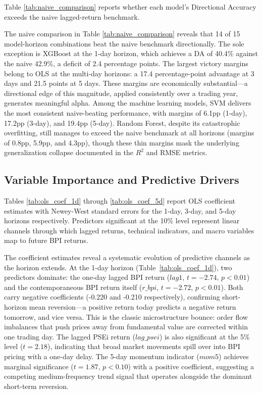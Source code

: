 \documentclass[12pt]{article}
\begin{document}
Table \ref{tab:naive_comparison} reports whether each model's Directional Accuracy exceeds the naive lagged-return benchmark.



The naive comparison in Table \ref{tab:naive_comparison} reveals that 14 of 15 model-horizon combinations beat the naive benchmark directionally. The sole exception is XGBoost at the 1-day horizon, which achieves a DA of 40.4\% against the naive 42.9\%, a deficit of 2.4 percentage points. The largest victory margins belong to OLS at the multi-day horizons: a 17.4 percentage-point advantage at 3 days and 21.5 points at 5 days. These margins are economically substantial---a directional edge of this magnitude, applied consistently over a trading year, generates meaningful alpha. Among the machine learning models, SVM delivers the most consistent naive-beating performance, with margins of 6.1pp (1-day), 17.2pp (3-day), and 19.4pp (5-day). Random Forest, despite its catastrophic overfitting, still manages to exceed the naive benchmark at all horizons (margins of 0.8pp, 5.9pp, and 4.3pp), though these thin margins mask the underlying generalization collapse documented in the $R^2$ and RMSE metrics.

\subsection{Variable Importance and Predictive Drivers}

Tables \ref{tab:ols_coef_1d} through \ref{tab:ols_coef_5d} report OLS coefficient estimates with Newey-West standard errors
for the 1-day, 3-day, and 5-day horizons respectively. Predictors significant at the 10\% level represent linear channels through
which lagged returns, technical indicators, and macro variables map to future BPI returns.





The coefficient estimates reveal a systematic evolution of predictive channels as the horizon extends. At the 1-day horizon (Table~\ref{tab:ols_coef_1d}), two predictors dominate: the one-day lagged BPI return ($lag1$, $t = -2.74$, $p < 0.01$) and the contemporaneous BPI return itself ($r\_bpi$, $t = -2.72$, $p < 0.01$). Both carry negative coefficients (-0.220 and -0.210 respectively), confirming short-horizon mean reversion---a positive return today predicts a negative return tomorrow, and vice versa. This is the classic microstructure bounce: order flow imbalances that push prices away from fundamental value are corrected within one trading day. The lagged PSEi return ($lag\_psei$) is also significant at the 5\% level ($t = 2.18$), indicating that broad market movements spill over into BPI pricing with a one-day delay. The 5-day momentum indicator ($mom5$) achieves marginal significance ($t = 1.87$, $p < 0.10$) with a positive coefficient, suggesting a competing medium-frequency trend signal that operates alongside the dominant short-term reversion.
\end{document}
